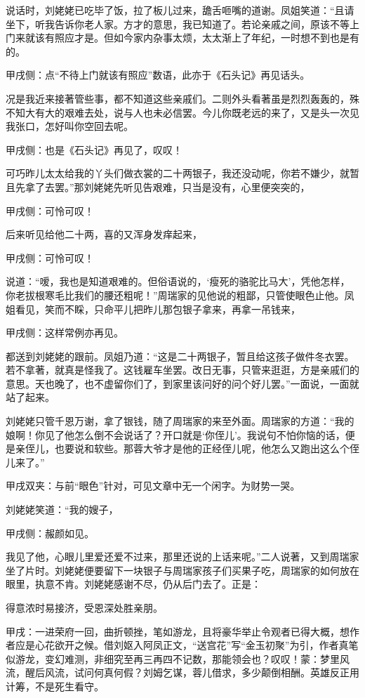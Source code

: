 \begin{parag}
    说话时，刘姥姥已吃毕了饭，拉了板儿过来，舚舌咂嘴的道谢。凤姐笑道：“且请坐下，听我告诉你老人家。方才的意思，我已知道了。若论亲戚之间，原该不等上门来就该有照应才是。但如今家内杂事太烦，太太渐上了年纪，一时想不到也是有的。\begin{note}甲戌侧：点“不待上门就该有照应”数语，此亦于《石头记》再见话头。\end{note}况是我近来接著管些事，都不知道这些亲戚们。二则外头看著虽是烈烈轰轰的，殊不知大有大的艰难去处，说与人也未必信罢。今儿你既老远的来了，又是头一次见我张口，怎好叫你空回去呢。\begin{note}甲戌侧：也是《石头记》再见了，叹叹！\end{note}可巧昨儿太太给我的丫头们做衣裳的二十两银子，我还没动呢，你若不嫌少，就暂且先拿了去罢。”那刘姥姥先听见告艰难，只当是没有，心里便突突的，\begin{note}甲戌侧：可怜可叹！\end{note}后来听见给他二十两，喜的又浑身发痒起来，\begin{note}甲戌侧：可怜可叹！\end{note}说道：“嗳，我也是知道艰难的。但俗语说的，‘瘦死的骆驼比马大’，凭他怎样，你老拔根寒毛比我们的腰还粗呢！”周瑞家的见他说的粗鄙，只管使眼色止他。凤姐看见，笑而不睬，只命平儿把昨儿那包银子拿来，再拿一吊钱来，\begin{note}甲戌侧：这样常例亦再见。\end{note}都送到刘姥姥的跟前。凤姐乃道：“这是二十两银子，暂且给这孩子做件冬衣罢。若不拿著，就真是怪我了。这钱雇车坐罢。改日无事，只管来逛逛，方是亲戚们的意思。天也晚了，也不虚留你们了，到家里该问好的问个好儿罢。”一面说，一面就站了起来。
\end{parag}


\begin{parag}
    刘姥姥只管千恩万谢，拿了银钱，随了周瑞家的来至外面。周瑞家的方道：“我的娘啊！你见了他怎么倒不会说话了？开口就是‘你侄儿’。我说句不怕你恼的话，便是亲侄儿，也要说和软些。那蓉大爷才是他的正经侄儿呢，他怎么又跑出这么个侄儿来了。”\begin{note}甲戌双夹：与前“眼色”针对，可见文章中无一个闲字。为财势一哭。\end{note}刘姥姥笑道：“我的嫂子，\begin{note}甲戌侧：赧颜如见。\end{note}我见了他，心眼儿里爱还爱不过来，那里还说的上话来呢。”二人说著，又到周瑞家坐了片时。刘姥姥便要留下一块银子与周瑞家孩子们买果子吃，周瑞家的如何放在眼里，执意不肯。刘姥姥感谢不尽，仍从后门去了。正是：
\end{parag}


\begin{poem}
    \begin{pl}得意浓时易接济，受恩深处胜亲朋。\end{pl}
\end{poem}


\begin{parag}
    \begin{note}甲戌：一进荣府一回，曲折顿挫，笔如游龙，且将豪华举止令观者已得大概，想作者应是心花欲开之候。借刘妪入阿凤正文，“送宫花”写“金玉初聚”为引，作者真笔似游龙，变幻难测，非细究至再三再四不记数，那能领会也？叹叹！蒙：梦里风流，醒后风流，试问何真何假？刘姆乞谋，蓉儿借求，多少颠倒相酬。英雄反正用计筹，不是死生看守。\end{note}
\end{parag}
